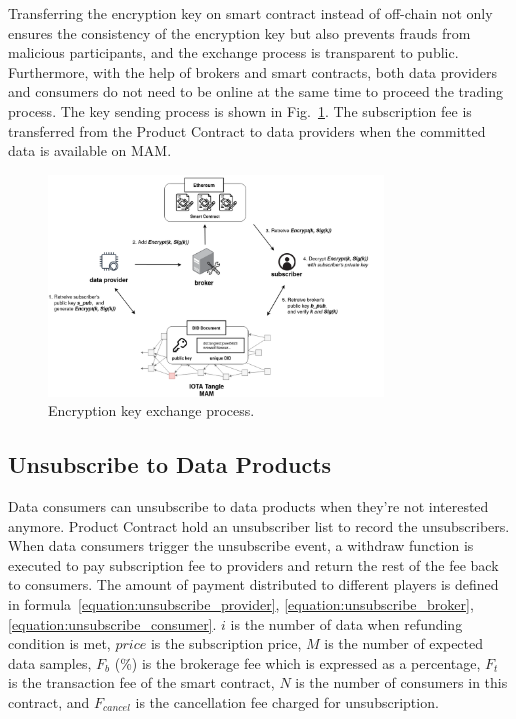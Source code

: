 \documentclass[conference]{IEEEtran}
\begin{document}
Transferring the encryption key on smart contract instead of off-chain not only ensures the consistency of the encryption key but also prevents frauds from malicious participants, and the exchange process is transparent to public. Furthermore, with the help of brokers and smart contracts, both data providers and consumers do not need to be online at the same time to proceed the trading process. The key sending process is shown in Fig.~\ref{fig:key_exchange}. The subscription fee is transferred from the Product Contract to data providers when the committed data is available on MAM.

\begin{figure}[!t]
    \centering
    \includegraphics[width=3.5in]{key_exchange}
    \caption{Encryption key exchange process.}
    \label{fig:key_exchange}
\end{figure}

\subsection{Unsubscribe to Data Products}
Data consumers can unsubscribe to data products when they're not interested anymore. Product Contract hold an unsubscriber list to record the unsubscribers. When data consumers trigger the unsubscribe event, a withdraw function is executed to pay subscription fee to providers and return the rest of the fee back to consumers. The amount of payment distributed to different players is defined in formula~\ref{equation:unsubscribe_provider}, \ref{equation:unsubscribe_broker}, \ref{equation:unsubscribe_consumer}. $i$ is the number of data when refunding condition is met, $price$  is the subscription price, $M$ is the number of expected data samples, $F_{b}$ (\%) is the brokerage fee which is expressed as a percentage, $F_{t}$ is the transaction fee of the smart contract, $N$ is the number of consumers in this contract, and $F_{cancel}$ is the cancellation fee charged for unsubscription. 
\end{document}
